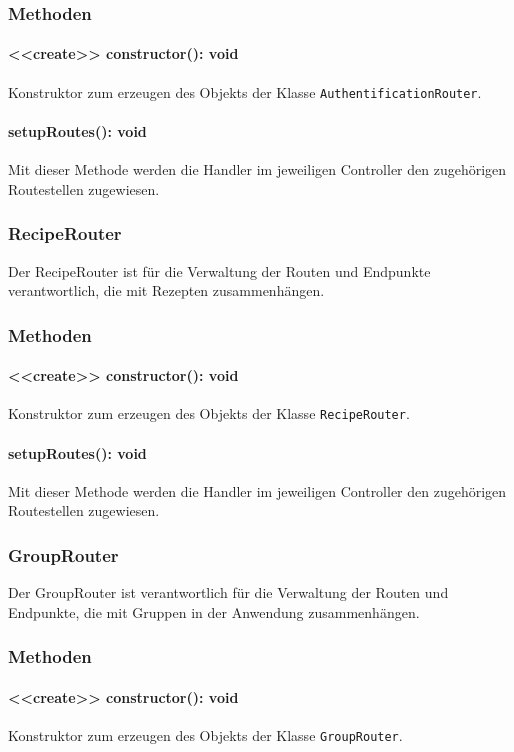 \documentclass[parskip=full]{scrartcl}
\begin{document}
\subsubsection*{Methoden}
\paragraph{<<create>> constructor(): void}Konstruktor zum erzeugen des Objekts der Klasse \texttt{AuthentificationRouter}.
\paragraph{setupRoutes(): void}Mit dieser Methode werden die Handler im jeweiligen Controller den zugehörigen Routestellen zugewiesen.

\subsubsection{RecipeRouter}
Der RecipeRouter ist für die Verwaltung der Routen und Endpunkte verantwortlich, die mit Rezepten zusammenhängen.
\subsubsection*{Methoden}
\paragraph{<<create>> constructor(): void}Konstruktor zum erzeugen des Objekts der Klasse \texttt{RecipeRouter}.
\paragraph{setupRoutes(): void}Mit dieser Methode werden die Handler im jeweiligen Controller den zugehörigen Routestellen zugewiesen.

\subsubsection{GroupRouter}
Der GroupRouter ist verantwortlich für die Verwaltung der Routen und Endpunkte, die mit Gruppen in der Anwendung zusammenhängen.
\subsubsection*{Methoden}
\paragraph{<<create>> constructor(): void}Konstruktor zum erzeugen des Objekts der Klasse \texttt{GroupRouter}.
\end{document}
